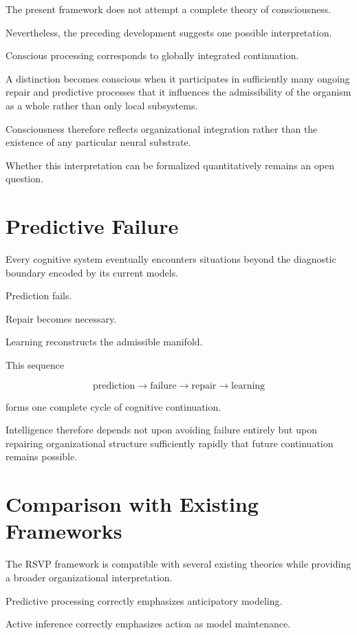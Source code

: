\documentclass[11pt,oneside]{book}
\numberwithin{equation}{chapter}
\theoremstyle{definition}
\theoremstyle{plain}
\begin{document}
The present framework does not attempt a complete theory of consciousness.

Nevertheless, the preceding development suggests one possible
interpretation.

Conscious processing corresponds to globally integrated continuation.

A distinction becomes conscious when it participates in sufficiently many
ongoing repair and predictive processes that it influences the admissibility
of the organism as a whole rather than only local subsystems.

Consciousness therefore reflects organizational integration rather than the
existence of any particular neural substrate.

Whether this interpretation can be formalized quantitatively remains an open
question.

\section{Predictive Failure}

Every cognitive system eventually encounters situations beyond the
diagnostic boundary encoded by its current models.

Prediction fails.

Repair becomes necessary.

Learning reconstructs the admissible manifold.

This sequence

\[
\text{prediction}
\rightarrow
\text{failure}
\rightarrow
\text{repair}
\rightarrow
\text{learning}
\]

forms one complete cycle of cognitive continuation.

Intelligence therefore depends not upon avoiding failure entirely but upon
repairing organizational structure sufficiently rapidly that future
continuation remains possible.

\section{Comparison with Existing Frameworks}

The RSVP framework is compatible with several existing theories while
providing a broader organizational interpretation.

Predictive processing correctly emphasizes anticipatory modeling.

Active inference correctly emphasizes action as model maintenance.
\end{document}
